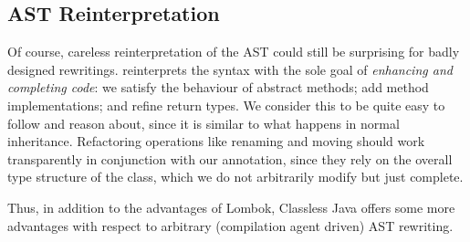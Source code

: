 \subsection{\mixin AST Reinterpretation}

Of course, careless reinterpretation of the AST could still be
surprising for badly designed rewritings.  \mixin reinterprets
the syntax with the sole goal of \emph{enhancing and completing code}:
we satisfy the behaviour of abstract methods; add method
implementations; and refine return types.  We consider this to be
quite easy to follow and reason about, since it is similar to what
happens in normal inheritance.  Refactoring operations like renaming
and moving should work transparently in conjunction with our
annotation, since they rely on the overall type structure of the
class, which we do not arbitrarily modify but just complete.

Thus, in addition to the advantages of Lombok, Classless Java offers
some more advantages with respect to arbitrary (compilation agent driven) AST rewriting.



